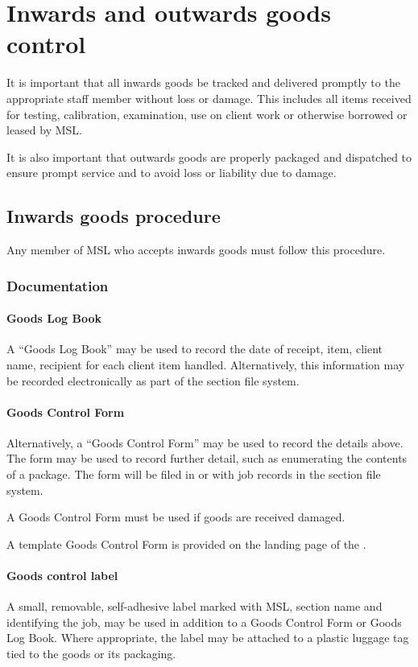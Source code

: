 \section{Inwards and outwards goods control}
\label{s:inwards_outwards_goods}
It is important that all inwards goods be tracked and delivered promptly to the appropriate staff member without loss or damage. This includes all items received for testing, calibration, examination, use on client work or otherwise borrowed or leased by MSL.

It is also important that outwards goods are properly packaged and dispatched to ensure prompt service and to avoid loss or liability due to damage.

\subsection{Inwards goods procedure}
Any member of MSL who accepts inwards goods must follow this procedure.

\subsubsection{Documentation}
\paragraph{Goods Log Book}
A ``Goods Log Book'' may be used to record the date of receipt, item, client name, recipient for each client item handled. Alternatively, this information may be recorded electronically as part of the section file system.

\paragraph{Goods Control Form}
Alternatively, a ``Goods Control Form'' may be used to record the details above.  The form may be used to record further detail, such as enumerating the contents of a package. The form will be filed in  or with job records in the section file system. 

A Goods Control Form must be used if goods are received damaged.

A template Goods Control Form is provided on the landing page of the .

\paragraph{Goods control label}
A small, removable, self-adhesive label marked with MSL, section name and identifying the job, may be used in addition to a Goods Control Form or Goods Log Book. Where appropriate, the label may be attached to a plastic luggage tag tied to the goods or its packaging.

